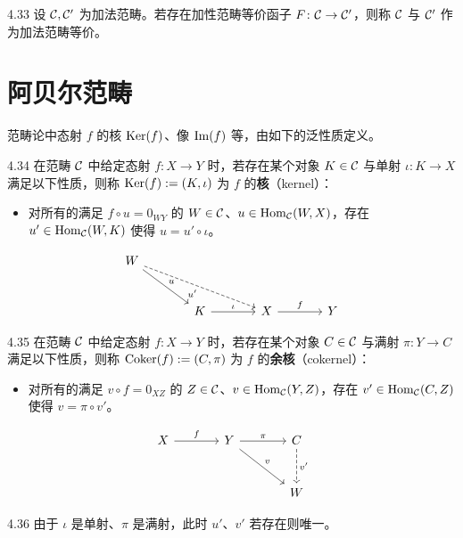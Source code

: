 \begin{definition}{4.33}
设 $\mathcal{C},\mathcal{C}'$ 为加法范畴。若存在加性范畴等价函子 $F\colon\mathcal{C}\to\mathcal{C}'$，则称 $\mathcal{C}$ 与 $\mathcal{C}'$ 作为加法范畴等价。
\end{definition}

\section{阿贝尔范畴}

范畴论中态射 $f$ 的核 $\operatorname{Ker}(f)$、像 $\operatorname{Im}(f)$ 等，由如下的泛性质定义。

\begin{definition}{4.34}
在范畴 $\mathcal{C}$ 中给定态射 $f\colon X\to Y$ 时，若存在某个对象 $K\in\mathcal{C}$ 与单射 $\iota\colon K\to X$ 满足以下性质，则称 $\operatorname{Ker}(f):=(K,\iota)$ 为 $f$ 的\textbf{核}（kernel）：
\begin{itemize}
  \item 对所有的满足 $f\circ u=0_{WY}$ 的 $W\in\mathcal{C}$、$u\in\operatorname{Hom}_{\mathcal{C}}(W,X)$，存在 $u'\in\operatorname{Hom}_{\mathcal{C}}(W,K)$ 使得 $u=u'\circ\iota$。
\end{itemize}
\[\begin{tikzcd}[row sep=2.6em, column sep=3.6em]
  W \arrow[dr,"u"] \arrow[drr,dashed,"u'"'] & & \\
  & K \arrow[r,"\iota"] & X \arrow[r,"f"] & Y
\end{tikzcd}\]
\end{definition}

\begin{definition}{4.35}
在范畴 $\mathcal{C}$ 中给定态射 $f\colon X\to Y$ 时，若存在某个对象 $C\in\mathcal{C}$ 与满射 $\pi\colon Y\to C$ 满足以下性质，则称 $\operatorname{Coker}(f):=(C,\pi)$ 为 $f$ 的\textbf{余核}（cokernel）：
\begin{itemize}
  \item 对所有的满足 $v\circ f=0_{XZ}$ 的 $Z\in\mathcal{C}$、$v\in\operatorname{Hom}_{\mathcal{C}}(Y,Z)$，存在 $v'\in\operatorname{Hom}_{\mathcal{C}}(C,Z)$ 使得 $v=\pi\circ v'$。
\end{itemize}
\[\begin{tikzcd}[row sep=2.8em, column sep=3.6em]
  X \arrow[r,"f"] & Y \arrow[r,"\pi"] \arrow[dr,"v"] & C \arrow[d,dashed,"v'"] \\
  & & W
\end{tikzcd}\]
\end{definition}

\begin{remark}{4.36}
由于 $\iota$ 是单射、$\pi$ 是满射，此时 $u'$、$v'$ 若存在则唯一。
\end{remark}

